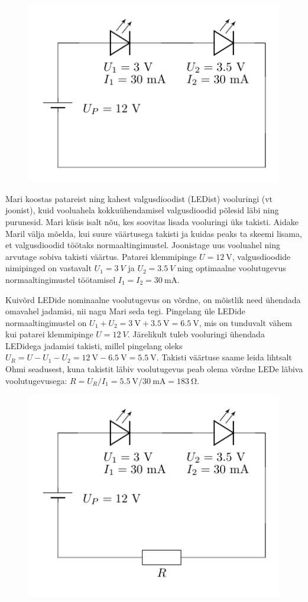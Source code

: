 
\begin{figure}
  \vspace{-30pt}
  \begin{center}
  \includegraphics[scale=0.8]{2024-v2g-03-yl.pdf}
  \vspace{-20pt}
  \end{center}
\end{figure}

Mari koostas patareist ning kahest valgusdioodist (LEDist) vooluringi (vt joonist), kuid vooluahela kokkuühendamisel valgusdioodid põlesid läbi ning purunesid. Mari küsis isalt nõu, kes soovitas lisada vooluringi üks takisti. Aidake Maril välja mõelda, kui suure väärtusega takisti ja kuidas peaks ta skeemi lisama, et valgusdioodid töötaks normaaltingimustel. Joonistage uus vooluahel ning arvutage sobiva takisti väärtus. Patarei klemmipinge $U=\SI{12}{\V}$, valgusdioodide nimipinged on vastavalt $U_1=\SI{3}{V}$ ja $U_2=\SI{3.5}{V}$ ning optimaalne voolutugevus normaaltingimustel töötamisel $I_1=I_2=\SI{30}{\milli\A}$.


\hint

\solu
Kuivõrd LEDide nominaalne voolutugevus on võrdne, on mõistlik need ühendada omavahel jadamisi, nii nagu Mari seda tegi. Pingelang üle LEDide normaaltingimustel on $U_1+U_2=\SI{3}{\V}+\SI{3.5}{\V}=\SI{6.5}{\V}$, mis on tunduvalt vähem kui patarei klemmipinge $U=\SI{12}{V}$. Järelikult tuleb vooluringi ühendada LEDidega jadamisi takisti, millel pingelang oleks $U_R=U-U_1-U_2=\SI{12}{\V}-\SI{6.5}{\V}=\SI{5.5}{\V}$. Takisti väärtuse saame leida lihtsalt Ohmi seadusest, kuna takistit läbiv voolutugevus peab olema võrdne LEDe läbiva voolutugevusega: $R=U_R/I_1=\SI{5.5}{\V}/\SI{30}{\milli\A}=\SI{183}{\ohm}$.

\begin{figure}[h]
    \centering
    \includegraphics[width=0.5\linewidth]{2024-v2g-03-sol.pdf}
\end{figure}
\probend